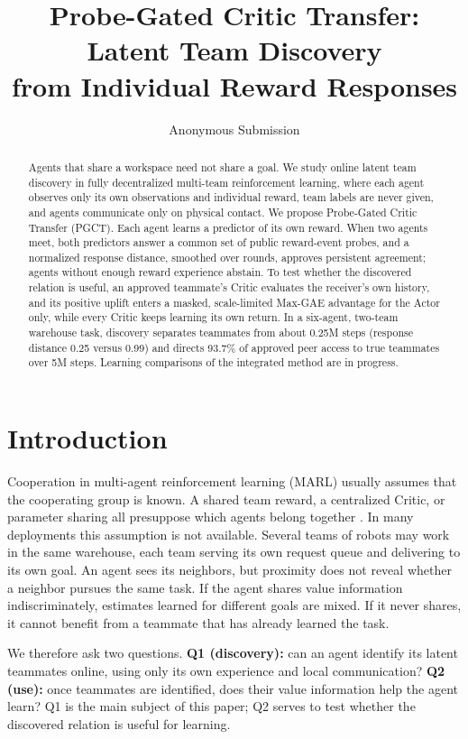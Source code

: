 \documentclass{article}
\title{Probe-Gated Critic Transfer: Latent Team Discovery\\from Individual Reward Responses}
\author{Anonymous Submission}
\begin{document}
\maketitle

\begin{abstract}
Agents that share a workspace need not share a goal. We study online latent team discovery in fully decentralized multi-team reinforcement learning, where each agent observes only its own observations and individual reward, team labels are never given, and agents communicate only on physical contact. We propose Probe-Gated Critic Transfer (PGCT). Each agent learns a predictor of its own reward. When two agents meet, both predictors answer a common set of public reward-event probes, and a normalized response distance, smoothed over rounds, approves persistent agreement; agents without enough reward experience abstain. To test whether the discovered relation is useful, an approved teammate's Critic evaluates the receiver's own history, and its positive uplift enters a masked, scale-limited Max-GAE advantage for the Actor only, while every Critic keeps learning its own return. In a six-agent, two-team warehouse task, discovery separates teammates from about 0.25M steps (response distance 0.25 versus 0.99) and directs 93.7\% of approved peer access to true teammates over 5M steps. Learning comparisons of the integrated method are in progress.
\end{abstract}

\section{Introduction}
Cooperation in multi-agent reinforcement learning (MARL) usually assumes that the cooperating group is known. A shared team reward, a centralized Critic, or parameter sharing all presuppose which agents belong together \cite{mappo,seps}. In many deployments this assumption is not available. Several teams of robots may work in the same warehouse, each team serving its own request queue and delivering to its own goal. An agent sees its neighbors, but proximity does not reveal whether a neighbor pursues the same task. If the agent shares value information indiscriminately, estimates learned for different goals are mixed. If it never shares, it cannot benefit from a teammate that has already learned the task.

We therefore ask two questions. \textbf{Q1 (discovery):} can an agent identify its latent teammates online, using only its own experience and local communication? \textbf{Q2 (use):} once teammates are identified, does their value information help the agent learn? Q1 is the main subject of this paper; Q2 serves to test whether the discovered relation is useful for learning.
\end{document}
